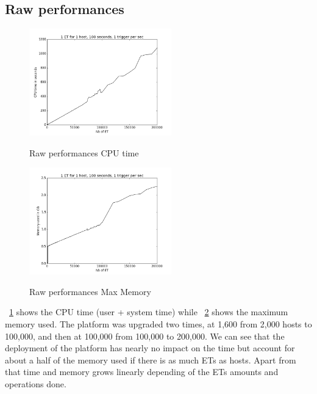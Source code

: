 \documentclass[a4paper]{IEEEtran}
\begin{document}
  \subsection{Raw performances}
    \begin{figure}
      \caption{Raw performances CPU time}
      \centering
      \includegraphics[width=0.55\textwidth]{../plots/raw_perf_time}
      \label{time_raw}
    \end{figure}
    \begin{figure}
      \caption{Raw performances Max Memory}
      \centering
      \includegraphics[width=0.55\textwidth]{../plots/raw_perf_mem}
      \label{mem_raw}
    \end{figure}
    
    \figurename~\ref{time_raw} shows the CPU time (user + system time) while 
    \figurename~\ref{mem_raw} shows the maximum memory used. The platform was
    upgraded two times, at 1,600 from 2,000 hosts to 100,000, and then at
    100,000 from 100,000 to 200,000. We can see that the deployment of the 
    platform has nearly no impact on the time but account for about a half of 
    the memory used if there is as much ETs as hosts. Apart from that time and 
    memory grows linearly depending of the ETs amounts and operations done.
    
    
\end{document}
